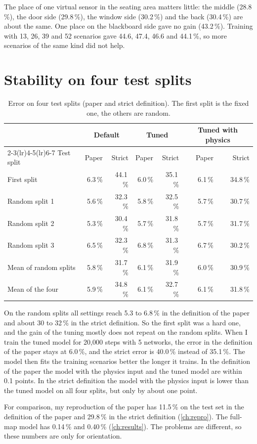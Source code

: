 The place of one virtual sensor in the seating area matters little: the middle (28.8\,\%), the door side
(29.8\,\%), the window side (30.2\,\%) and the back (30.4\,\%) are about the same. One place on the blackboard
side gave no gain (43.2\,\%). Training with 13, 26, 39 and 52 scenarios gave 44.6, 47.4, 46.6 and 44.1\,\%, so
more scenarios of the same kind did not help.

\section{Stability on four test splits}
\begin{table}[!htbp]
  \centering
  \caption[Four test splits.]{Error on four test splits (paper and strict definition). The first split is the fixed
  one, the others are random.}
  \label{tab:splits}
  \footnotesize
  \setlength{\tabcolsep}{3pt}
  \begin{tabular}{>{\raggedright}p{3.2cm}rrrrrr}
    \toprule
     & \multicolumn{2}{c}{Default} & \multicolumn{2}{c}{Tuned} & \multicolumn{2}{c}{Tuned with physics}\\
    \cmidrule(lr){2-3}\cmidrule(lr){4-5}\cmidrule(lr){6-7}
    Test split & Paper & Strict & Paper & Strict & Paper & Strict\\
    \midrule
    First split & 6.3\,\% & 44.1\,\% & 6.0\,\% & 35.1\,\% & 6.1\,\% & 34.8\,\%\\
    Random split 1 & 5.6\,\% & 32.3\,\% & 5.8\,\% & 32.5\,\% & 5.7\,\% & 30.7\,\%\\
    Random split 2 & 5.3\,\% & 30.4\,\% & 5.7\,\% & 31.8\,\% & 5.7\,\% & 31.7\,\%\\
    Random split 3 & 6.5\,\% & 32.3\,\% & 6.8\,\% & 31.3\,\% & 6.7\,\% & 30.2\,\%\\
    Mean of random splits & 5.8\,\% & 31.7\,\% & 6.1\,\% & 31.9\,\% & 6.0\,\% & 30.9\,\%\\
    Mean of the four & 5.9\,\% & 34.8\,\% & 6.1\,\% & 32.7\,\% & 6.1\,\% & 31.8\,\%\\
    \bottomrule
  \end{tabular}
\end{table}

On the random splits all settings reach 5.3 to 6.8\,\% in the definition of the paper and about 30 to 32\,\% in
the strict definition. So the first split was a hard one, and the gain of the tuning mostly does not repeat on the
random splits. When I train the tuned model for 20,000 steps with 5 networks, the error in the definition of the
paper stays at 6.0\,\%, and the strict error is 40.0\,\% instead of 35.1\,\%. The model then fits the training
scenarios better the longer it trains. In the definition of the paper the model with the physics input and the tuned
model are within 0.1 points. In the strict definition the model with the physics input is lower than the tuned
model on all four splits, but only by about one point.

For comparison, my reproduction of the paper has 11.5\,\% on the test set in the definition of the paper and
29.8\,\% in the strict definition (\cref{ch:repro}). The full-map model has 0.14\,\% and 0.40\,\%
(\cref{ch:results}). The problems are different, so these numbers are only for orientation.
